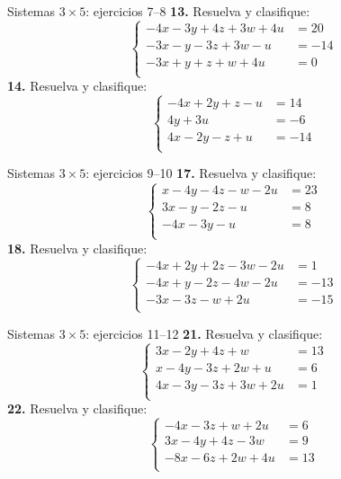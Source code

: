 \documentclass[aspectratio=169]{beamer}
\begin{document}
\begin{frame}{Sistemas $3\times 5$: ejercicios 7--8}
\scriptsize
\textbf{13.} Resuelva y clasifique:
\[\left\{\begin{aligned}
-4x-3y+4z+3w+4u&=20\\
-3x-y-3z+3w-u&=-14\\
-3x+y+z+w+4u&=0\\
\end{aligned}\right.\]
\textbf{14.} Resuelva y clasifique:
\[\left\{\begin{aligned}
-4x+2y+z-u&=14\\
4y+3u&=-6\\
4x-2y-z+u&=-14\\
\end{aligned}\right.\]
\end{frame}
\begin{frame}{Sistemas $3\times 5$: ejercicios 9--10}
\scriptsize
\textbf{17.} Resuelva y clasifique:
\[\left\{\begin{aligned}
x-4y-4z-w-2u&=23\\
3x-y-2z-u&=8\\
-4x-3y-u&=8\\
\end{aligned}\right.\]
\textbf{18.} Resuelva y clasifique:
\[\left\{\begin{aligned}
-4x+2y+2z-3w-2u&=1\\
-4x+y-2z-4w-2u&=-13\\
-3x-3z-w+2u&=-15\\
\end{aligned}\right.\]
\end{frame}
\begin{frame}{Sistemas $3\times 5$: ejercicios 11--12}
\scriptsize
\textbf{21.} Resuelva y clasifique:
\[\left\{\begin{aligned}
3x-2y+4z+w&=13\\
x-4y-3z+2w+u&=6\\
4x-3y-3z+3w+2u&=1\\
\end{aligned}\right.\]
\textbf{22.} Resuelva y clasifique:
\[\left\{\begin{aligned}
-4x-3z+w+2u&=6\\
3x-4y+4z-3w&=9\\
-8x-6z+2w+4u&=13\\
\end{aligned}\right.\]
\end{frame}
\end{document}
